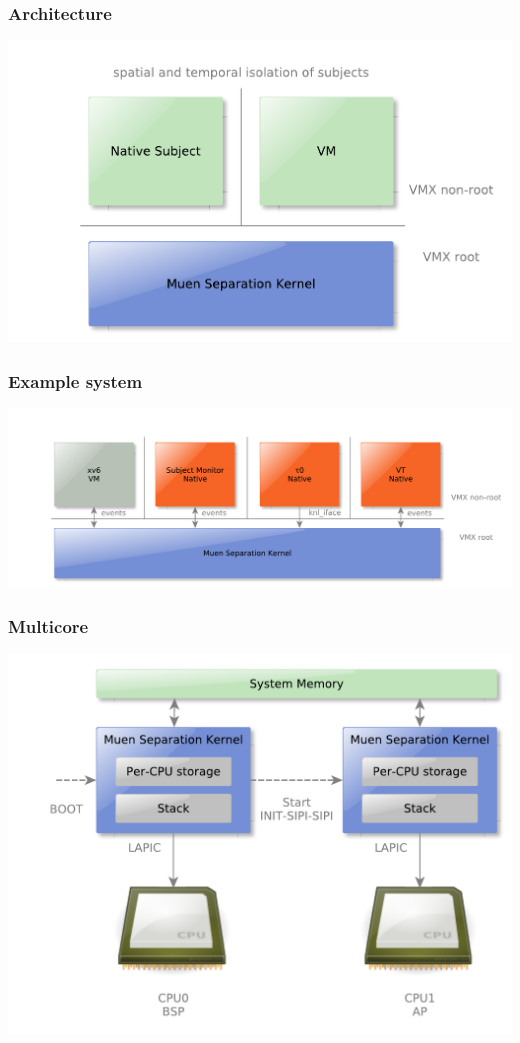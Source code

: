 \documentclass{beamer}
\begin{document}
\begin{frame}\frametitle{Architecture}
\begin{center}
	\includegraphics[scale=0.5]{images/architecture-overview.pdf}
\end{center}
\end{frame}

\begin{frame}\frametitle{Example system}
\begin{center}
	\includegraphics[width=\textwidth]{images/architecture-example_system.pdf}
\end{center}
\end{frame}

\begin{frame}\frametitle{Multicore}
	\includegraphics[scale=0.5]{images/mp-overview.pdf}
\end{frame}
\end{document}
